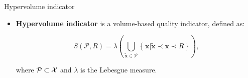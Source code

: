 \documentclass[11pt,compress,t,notes=noshow, xcolor=table]{beamer}
\begin{document}
\begin{vbframe}{Hypervolume indicator}

\begin{minipage}[t]{1\textwidth}
\begin{itemize}
\small
\item \textbf{Hypervolume indicator} is a volume-based quality indicator, defined as:
\footnotesize

\vspace{-0.2cm}
$$S(\mathcal{P}, R) = \lambda\left(\bigcup_{\tilde{\bm{x}} \in \mathcal{P}}\left\{\bm{x} | \tilde{\bm{x}} \prec \bm{x} \prec R\right\}\right),$$ 

\vspace{-0.1cm} 
where $\mathcal{P} \subset \mathcal{X}$ and $\lambda$ is the Lebesgue measure.
\end{itemize}
\end{minipage}



\end{vbframe}
\end{document}
